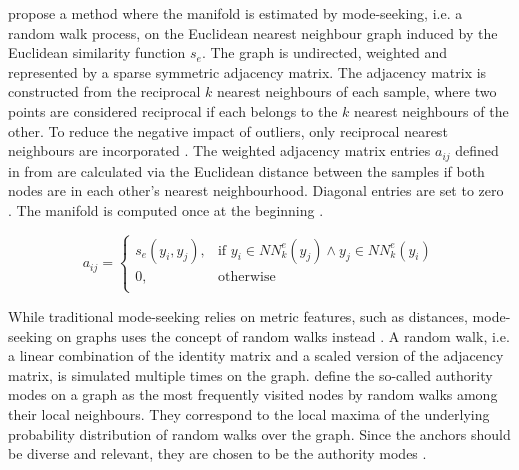 \citet{mining_manifolds_2018} propose a method where the manifold is estimated by mode-seeking, i.e. a random walk process, 
on the Euclidean nearest neighbour graph induced by the Euclidean similarity function $s_e$.
The graph is undirected, weighted and represented by a sparse symmetric adjacency matrix.
The adjacency matrix is constructed from the reciprocal $k$ nearest neighbours of each sample, 
where two points are considered reciprocal if each belongs to the $k$ nearest neighbours of the other. 
To reduce the negative impact of outliers, only reciprocal nearest neighbours are incorporated \citet{diffusion_2017,mining_manifolds_2018,fast_2018}.
The weighted adjacency matrix entries $a_{ij}$ defined in  from \citet{mining_manifolds_2018} 
are calculated via the Euclidean distance between the samples if both nodes are in each other's nearest neighbourhood.
Diagonal entries are set to zero \citet{mining_manifolds_2018,fast_2018}.
The manifold is computed once at the beginning \citet{mining_manifolds_2018}.

\begin{equation}
    a_{ij} = \begin{cases}
        s_e(y_i,y_j), & \text{if } y_i \in NN^e_k(y_j)\wedge y_j \in NN^e_k(y_i)\\
        0, & \text{otherwise}\\
      \end{cases}     
    \label{eq:mining_manifolds_adjacency_matrix}
\end{equation}



While traditional mode-seeking relies on metric features, such as distances, mode-seeking on graphs 
uses the concept of random walks instead \citet{mode_seeking_2012}.
A random walk, i.e. a linear combination of the identity matrix and a scaled version of the adjacency matrix, is simulated multiple times on the graph.
\citet{mode_seeking_2012} define the so-called authority modes on a graph 
as the most frequently visited nodes by random walks among their local neighbours.
They correspond to the local maxima of the underlying probability distribution of random walks over the graph.
Since the anchors should be diverse and relevant, they are chosen to be the authority modes \citet{mining_manifolds_2018}.

